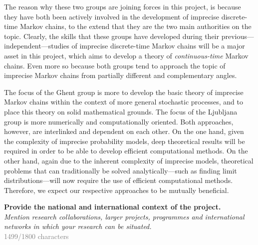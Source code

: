 \documentclass[11pt,dvipsnames,usenames,a4paper]{article}
\begin{document}
The reason why these two groups are joining forces in this project, is because they have both been actively involved in the development of imprecise discrete-time Markov chains, to the extend that they are the two main authorities on the topic. Clearly, the skills that these groups have developed during their previous---independent---studies of imprecise discrete-time Markov chains will be a major asset in this project, which aims to develop a theory of \emph{continuous-time} Markov chains. Even more so because both groups tend to approach the topic of imprecise Markov chains from partially different and complementary angles.

The focus of the Ghent group is more to develop the basic theory of imprecise Markov chains within the context of more general stochastic processes, and to place this theory on solid mathematical grounds. The focus of the Ljubljana group is more numerically and computationally oriented. Both approaches, however, are interlinked and dependent on each other. On the one hand, given the complexity of imprecise probability models, deep theoretical results will be required in order to be able to develop efficient computational methods. On the other hand, again due to the inherent complexity of imprecise models, theoretical problems that can traditionally be solved analytically---such as finding limit distributions---will now require the use of efficient computational methods. Therefore, we expect our respective approaches to be mutually beneficial.





\textbf{Provide the national and international context of the project.}\\
\textit{Mention research collaborations, larger projects, programmes and international networks in which your research can be situated.}\\
\textcolor{Gray}{1499/1800 characters}
\end{document}

